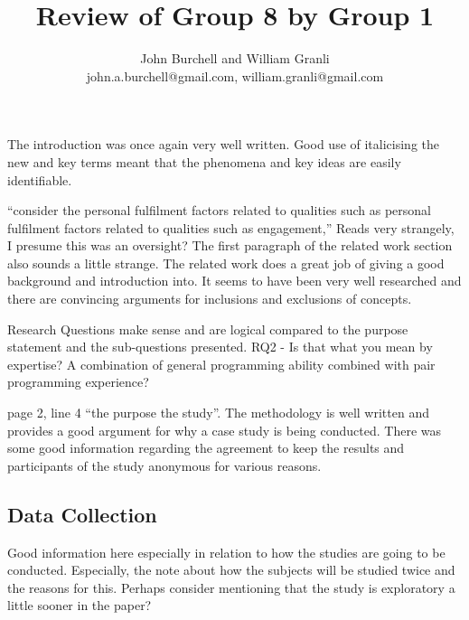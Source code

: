 \documentclass[times, 10pt,twocolumn]{article}
\begin{document}
\title{Review of Group 8 by Group 1}

\author{John Burchell and William Granli \\
john.a.burchell@gmail.com, william.granli@gmail.com}



\maketitle
\thispagestyle{empty}







The introduction was once again very well written. Good use of italicising the new and key terms meant that the phenomena and key ideas are easily identifiable. 

``consider the personal fulfilment factors related to qualities such as personal fulfilment factors related to qualities such as engagement,'' Reads very strangely, I presume this was an oversight? The first paragraph of the related work section also sounds a little strange. The related work does a great job of giving a good background and introduction into. It seems to have been very well researched and there are convincing arguments for inclusions and exclusions of concepts.

Research Questions make sense and are logical compared to the purpose statement and the sub-questions presented.
RQ2 - Is that what you mean by expertise? A combination of general programming ability combined with pair programming experience?

page 2, line 4 ``the purpose the study''.
The methodology is well written and provides a good argument for why a case study is being conducted. There was some good information regarding the agreement to keep the results and participants of the study anonymous for various reasons.

\subsection{Data Collection}
Good information here especially in relation to how the studies are going to be conducted. Especially, the note about how the subjects will be studied twice and the reasons for this. Perhaps consider mentioning that the study is exploratory a little sooner in the paper?
\end{document}
